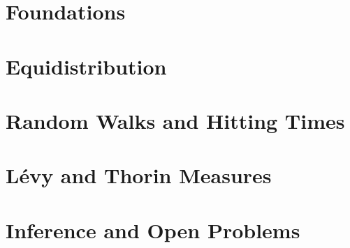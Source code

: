 \documentclass[11pt,openany,twoside]{book}
\theoremstyle{plainsc}
\theoremstyle{defsc}
\begin{document}
\frontmatter

\tableofcontents

\mainmatter
\part{Foundations}



\part{Equidistribution}






\part{Random Walks and Hitting Times}


\part{L\'evy and Thorin Measures}




















\part{Inference and Open Problems}




\appendix


\backmatter

\printindex
\end{document}
